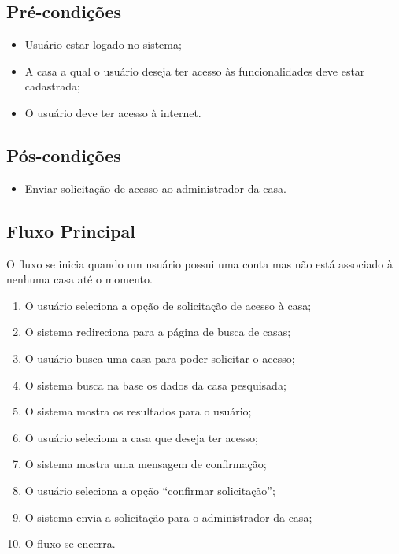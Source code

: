 \begin{anexosenv}
    \subsection{Pré-condições}
        \begin{itemize}
            \item Usuário estar logado no sistema;
            \item A casa a qual o usuário deseja ter acesso às funcionalidades deve estar cadastrada;
            \item O usuário deve ter acesso à internet.
        \end{itemize}
    \subsection{Pós-condições}
        \begin{itemize}
            \item Enviar solicitação de acesso ao administrador da casa.
        \end{itemize}
    \subsection{Fluxo Principal}
        O fluxo se inicia quando um usuário possui uma conta mas não está associado à nenhuma casa até o momento.
        \begin{enumerate}
            \item O usuário seleciona a opção de solicitação de acesso à casa;
            \item O sistema redireciona para a página de busca de casas;
            \item O usuário busca uma casa para poder solicitar o acesso;
            \item O sistema busca na base os dados da casa pesquisada;
            \item O sistema mostra os resultados para o usuário;
            \item O usuário seleciona a casa que deseja ter acesso;
            \item O sistema mostra uma mensagem de confirmação;
            \item O usuário seleciona a opção “confirmar solicitação”;
            \item O sistema envia a solicitação para o administrador da casa;
            \item O fluxo se encerra.
        \end{enumerate}


\end{anexosenv}
